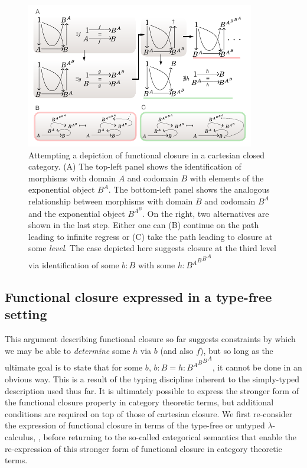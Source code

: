 \documentclass[10pt]{article}
\theoremstyle{plain}
\theoremstyle{definition}
\theoremstyle{remark}
\begin{document}
\begin{figure}
\begin{center}
\noindent\includegraphics[width=0.75\columnwidth]{fig/mrcatclosure.pdf}
\end{center}
\caption[Functional closure in a Cartesion closed category]{Attempting a depiction of functional closure in a cartesian closed category. (A) The top-left panel shows the identification of morphisms with domain $A$ and codomain $B$ with elements of the exponential object $B^A$. The bottom-left panel shows the analogous relationship between morphisms with domain $B$ and codomain $B^A$ and the exponential object $B^{A^B}$. On the right, two alternatives are shown in the last step. Either one can (B) continue on the path leading to infinite regress or (C) take the path leading to closure at some \emph{level}. The case depicted here suggests closure at the third level via identification of some $b:B$ with some $h:{{{{B^A}^B}^B}^A}$}
\label{fig:hom}
\end{figure}

\subsection{Functional closure expressed in a type-free setting}
This argument describing functional closure so far suggests constraints by which we may be able to \emph{determine} some $h$ via $b$ (and also $f$), but so long as the ultimate goal is to state that for some $b$, $b:B = h:{{{{B^A}^B}^B}^A}$, it cannot be done in an obvious way. This is a result of the typing discipline inherent to the simply-typed description used thus far. It is ultimately possible to express the stronger form of the functional closure property in category theoretic terms, but additional conditions are required on top of those of cartesian closure. We first re-consider the expression of functional closure in terms of the type-free or untyped $\lambda$-calculus, \cite{Barendregt1985}, before returning to the so-called categorical semantics that enable the re-expression of this stronger form of functional closure in category theoretic terms.
\end{document}
